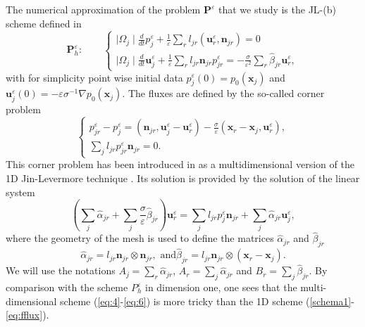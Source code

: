 \documentclass[a4paper,french,english,10pt]{article}
\newcommand\ljr{l_{jr}}
\newcommand\njr{\mathbf{n}_{jr}}
\newcommand\uu{\mathbf{u}}
\newcommand\eps{\varepsilon}
\newcommand\alj{\widehat{\alpha}_{jr}}
\newcommand\bej{\widehat{\beta}_{jr}}
\newcommand\xj{\mathbf{x}_j}
\newcommand\xr{\mathbf{x}_r}
\newcommand\uj{\uu_j}
\newcommand\ur{\uu_r}
\begin{document}
The numerical approximation  
 of the problem  $\mathbf P^\eps$ that we study 
 is the JL-(b) scheme defined
in   \cite{glaceap}
\begin{equation}\label{eq:4}
\mathbf P_h^\eps:
\qquad \left\{ 
\begin{array}{l}
\displaystyle \mid\Omega_{j}\mid\frac{d}{dt} p_{j}^{\eps}+\frac{1}{\varepsilon}
\sum_{r}l_{jr}(\ur^{\eps},\njr)=0\\
\displaystyle \mid
\Omega_{j}\mid\frac{d}{dt}\uj^{\eps}+\frac{1}{\varepsilon}
\sum_{r} l_{jr} \njr    p_{jr}^{\eps}=-\frac{\sigma}{\varepsilon^{2}}\sum_{r}\widehat{
\beta}_{jr}\ur^{\eps},
\end{array}
\right.
\end{equation}
with for simplicity point wise  initial data $p_j^{\eps}(0)=p_0(\mathbf{x}_j)$ and $\mathbf{u}_j^{\eps}(0) = -\eps\sigma^{-1}\nabla p_0(\mathbf{x}_j)$.
The fluxes are defined by the so-called 
corner problem 
\begin{equation}\label{eq:5}
\left\{ \begin{array}{l}
\displaystyle 
p_{jr}^{\eps}-p_j^\eps=
(\njr,    \uj^{\eps}-\ur^{\eps}
)-\frac{\sigma}{\varepsilon}( \xr -\xj, \ur^{\eps}), 
\\
\sum_{j}\ljr
p_{jr}^{\eps}\njr=0.
 \end{array}\right.
\end{equation}
This corner problem has been introduced in 
\cite{glaceap} as a multidimensional version
of the 1D Jin-Levermore technique   \cite{jinlev}.
Its solution is provided by the solution
of the  linear system
\begin{equation} \label{eq:5bis}
\displaystyle \left( \sum_{j}\alj+ 
\sum_{j}\frac{\sigma}{\varepsilon}\bej\right)\ur^{
\eps}= \sum_{j}\ljr
p_j^{\eps}\njr+\sum_j\alj\uj^{\eps},
\end{equation}
 where the geometry of the mesh is used to define the  
  matrices  
$\alj$ and $\bej$ 
\begin{equation}\label{eq:6}
\alj=\ljr\njr\otimes\njr,\mbox{ and
}\bej=\ljr\njr\otimes(\xr-\xj) .
\end{equation}
We will use the notations
$A_j=\sum_r\alj$, $A_r=\sum_j\alj$ and
$B_r=\sum_j\bej$. 
By comparison with the scheme $P_h^\eps$ in dimension one, one sees %
that the multi-dimensional scheme (\ref{eq:4}-\ref{eq:6})  is  more 
tricky than the 1D scheme (\ref{schema1}-\ref{eq:fflux}).
\end{document}
